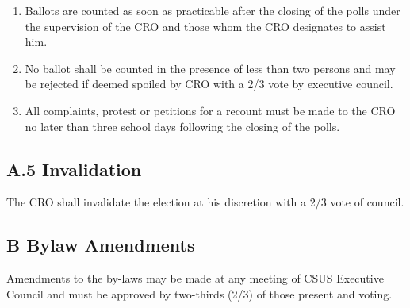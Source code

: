 \begin{enumerate}
\def\labelenumi{\arabic{enumi}.}
\item
  Ballots are counted as soon as practicable after the closing of the
  polls under the supervision of the CRO and those whom the CRO
  designates to assist him.
\item
  No ballot shall be counted in the presence of less than two persons
  and may be rejected if deemed spoiled by CRO with a 2/3 vote by
  executive council.
\item
  All complaints, protest or petitions for a recount must be made to the
  CRO no later than three school days following the closing of the
  polls.
\end{enumerate}

\subsection{A.5 Invalidation}\label{a.5-invalidation}

The CRO shall invalidate the election at his discretion with a 2/3 vote
of council.

\subsection{B Bylaw Amendments}\label{b-bylaw-amendments}

Amendments to the by-laws may be made at any meeting of CSUS Executive
Council and must be approved by two-thirds (2/3) of those present and
voting.
